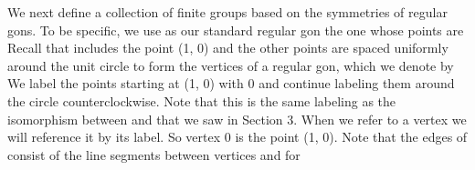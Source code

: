 \documentclass[11pt,oneside]{article}
\begin{document}
\begin{BookBody}

\noindent We next define a collection of finite groups based on the symmetries of regular gons. To be specific, we use as our standard regular gon the one whose points are  Recall that  includes the point (1, 0) and the other points are spaced uniformly around the unit circle to form the vertices of a regular gon, which we denote by  We label the points starting at (1, 0) with 0 and continue labeling them  around the circle counterclockwise. Note that this is the same labeling as the isomorphism between  and  that we saw in Section 3. When we refer to a vertex we will reference it by its label. So vertex 0 is the point (1, 0). Note that the edges of  consist of the line segments between vertices  and  for 

\end{BookBody}

\BookNarrativetrue
\end{document}
